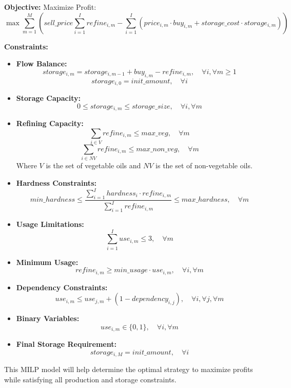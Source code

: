 \documentclass{article}
\begin{document}
\textbf{Objective:} Maximize Profit:
\[
\max \sum_{m=1}^{M} \left( sell\_price \sum_{i=1}^{I} refine_{i,m} - \sum_{i=1}^{I} (price_{i,m} \cdot buy_{i,m} + storage\_cost \cdot storage_{i,m}) \right)
\]

\textbf{Constraints:}

\begin{itemize}
    \item \textbf{Flow Balance:}
    \[
    storage_{i,m} = storage_{i,m-1} + buy_{i,m} - refine_{i,m}, \quad \forall i, \forall m \geq 1
    \]
    \[
    storage_{i,0} = init\_amount, \quad \forall i
    \]

    \item \textbf{Storage Capacity:}
    \[
    0 \leq storage_{i,m} \leq storage\_size, \quad \forall i, \forall m
    \]
    
    \item \textbf{Refining Capacity:}
    \[
    \sum_{i \in V} refine_{i,m} \leq max\_veg, \quad \forall m
    \]
    \[
    \sum_{i \in NV} refine_{i,m} \leq max\_non\_veg, \quad \forall m
    \]
    Where $V$ is the set of vegetable oils and $NV$ is the set of non-vegetable oils.
    
    \item \textbf{Hardness Constraints:}
    \[
    min\_hardness \leq \frac{\sum_{i=1}^{I} hardness_i \cdot refine_{i,m}}{\sum_{i=1}^{I} refine_{i,m}} \leq max\_hardness, \quad \forall m
    \]
    
    \item \textbf{Usage Limitations:}
    \[
    \sum_{i=1}^{I} use_{i,m} \leq 3, \quad \forall m
    \]

    \item \textbf{Minimum Usage:}
    \[
    refine_{i,m} \geq min\_usage \cdot use_{i,m}, \quad \forall i, \forall m
    \]
    
    \item \textbf{Dependency Constraints:}
    \[
    use_{i,m} \leq use_{j,m} + (1 - dependency_{i,j}), \quad \forall i, \forall j, \forall m
    \]
    
    \item \textbf{Binary Variables:}
    \[
    use_{i,m} \in \{0, 1\}, \quad \forall i, \forall m
    \]

    \item \textbf{Final Storage Requirement:}
    \[
    storage_{i,M} = init\_amount, \quad \forall i
    \]
\end{itemize}

This MILP model will help determine the optimal strategy to maximize profits while satisfying all production and storage constraints.
\end{document}
